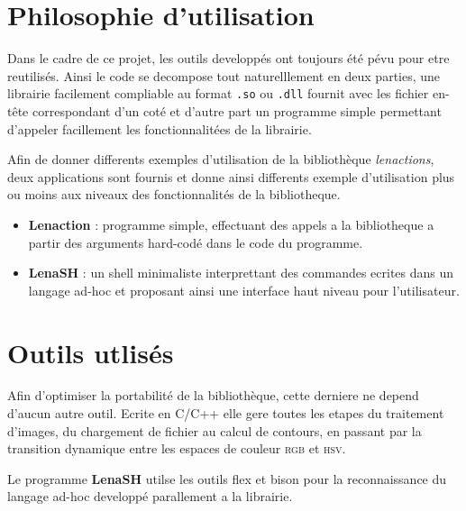 
\usepackage{subfigure}


\maketitle

\section*{Philosophie d'utilisation}
Dans le cadre de ce projet, les outils developpés ont toujours été pévu pour etre reutilisés. Ainsi le code se decompose tout naturelllement en deux parties, une librairie facilement compliable au format \texttt{.so} ou \texttt{.dll} fournit avec les fichier en-tête correspondant d'un coté et d'autre part un programme simple permettant d'appeler facillement les fonctionnalitées de la librairie.

Afin de donner differents exemples d'utilisation de la bibliothèque \emph{lenactions}, deux applications sont fournis et donne ainsi differents exemple d'utilisation plus ou moins aux niveaux des fonctionnalités de la bibliotheque.
\begin{itemize}
	\item \textbf{Lenaction} : programme simple, effectuant des appels a la bibliotheque a partir des arguments hard-codé dans le code du programme.
	\item \textbf{LenaSH} : un shell minimaliste interprettant des commandes ecrites dans un langage ad-hoc et proposant ainsi une interface haut niveau pour l'utilisateur.
\end{itemize}

\section*{Outils utlisés}
Afin d'optimiser la portabilité de la bibliothèque, cette derniere ne depend d'aucun autre outil. Ecrite en C/C++ elle gere toutes les etapes du traitement d'images, du chargement de fichier au calcul de contours, en passant par la transition dynamique entre les espaces de couleur \textsc{rgb} et \textsc{hsv}.

Le programme \textbf{LenaSH} utilse les outils flex et bison pour la reconnaissance du langage ad-hoc developpé parallement a la librairie.

